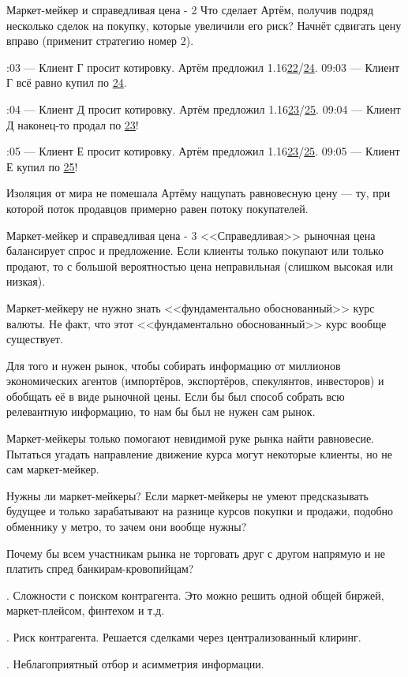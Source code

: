 \documentclass{beamer}
\newcommand{\eurusdBigFigures}{1.16}
\begin{document}
\begin{frame}{Маркет-мейкер и справедливая цена - 2}
\justify
Что сделает Артём, получив подряд несколько сделок на покупку, которые увеличили 
его риск? Начнёт сдвигать цену вправо (применит стратегию номер 2).

:03 --- Клиент Г просит котировку. Артём предложил \eurusdBigFigures\underline{22}/\underline{24}.
09:03 --- Клиент Г всё равно купил по \underline{24}.

:04 --- Клиент Д просит котировку. Артём предложил \eurusdBigFigures\underline{23}/\underline{25}.
09:04 --- Клиент Д наконец-то продал по \underline{23}!

:05 --- Клиент Е просит котировку. Артём предложил \eurusdBigFigures\underline{23}/\underline{25}.
09:05 --- Клиент Е купил по \underline{25}!

\justify
Изоляция от мира не помешала Артёму нащупать равновесную цену --- ту, при которой поток продавцов примерно равен потоку покупателей.
\end{frame}



\begin{frame}{Маркет-мейкер и справедливая цена - 3}
\justify
<<Справедливая>> рыночная цена балансирует спрос и предложение.
Если клиенты только покупают или только продают, то с большой вероятностью цена 
неправильная (слишком высокая или низкая).

\justify
Маркет-мейкеру не нужно знать <<фундаментально обоснованный>> курс валюты. Не факт, что этот <<фундаментально обоснованный>> курс вообще существует.

\justify
Для того и нужен рынок, чтобы собирать информацию от миллионов экономических 
агентов (импортёров, экспортёров, спекулянтов, инвесторов) и обобщать её в виде
рыночной цены. Если бы был способ собрать всю релевантную информацию, то нам бы
был не нужен сам рынок.

\justify
Маркет-мейкеры только помогают невидимой руке рынка найти равновесие. Пытаться 
угадать направление движение курса могут некоторые клиенты, но не сам маркет-мейкер.
\end{frame}



\begin{frame}{Нужны ли маркет-мейкеры?}
\justify
Если маркет-мейкеры не умеют предсказывать будущее и только зарабатывают на 
разнице курсов покупки и продажи, подобно обменнику у метро, то зачем они вообще 
нужны?

\justify
Почему бы всем участникам рынка не торговать друг с другом напрямую и не платить
спред банкирам-кровопийцам?

. Сложности с поиском контрагента. Это можно решить одной общей биржей,
маркет-плейсом, финтехом и т.д.

. Риск контрагента. Решается сделками через централизованный клиринг.

. Неблагоприятный отбор и асимметрия информации.
\end{frame}
\end{document}
